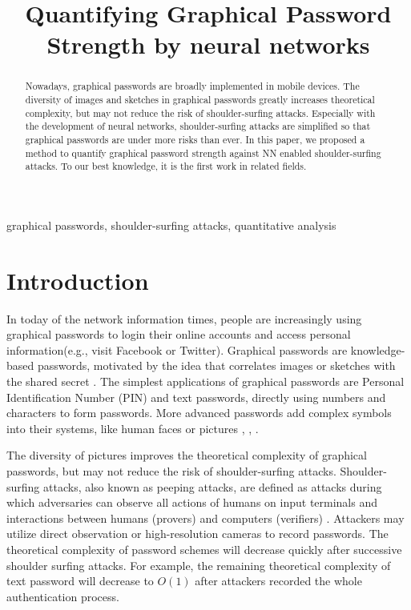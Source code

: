 \documentclass{article}
\title{Quantifying Graphical Password Strength by neural networks}
\begin{document}
  \maketitle
  \begin{abstract}
  Nowadays, graphical passwords are broadly implemented in mobile devices. The diversity of images and sketches 
  in graphical passwords greatly increases theoretical complexity, but may not reduce the risk of 
  shoulder-surfing attacks. Especially with the development of neural networks, shoulder-surfing attacks are 
  simplified so that graphical passwords are under more risks than ever. In this paper, we proposed a method 
  to quantify graphical password strength against NN enabled shoulder-surfing attacks. To our best knowledge, 
  it is the first work in related fields.
  \end{abstract}
  \begin{keywords}
  graphical passwords, shoulder-surfing attacks, quantitative analysis
  \end{keywords}
  \section{Introduction}
  \label{sec:intro}
  
  In today of the network information times, people are increasingly using graphical passwords
  to login their online accounts and access personal information(e.g., visit Facebook or Twitter). 
  Graphical passwords are knowledge-based passwords, motivated by the idea that correlates images 
  or sketches with the shared secret \cite{DBLP:journals/csur/BiddleCO12}. 
  The simplest applications of graphical passwords are Personal Identification Number (PIN) 
  and text passwords, directly using numbers and characters to form passwords. More advanced passwords 
  add complex symbols into their systems, like human faces or pictures \cite{Passfaces}, 
  \cite{DBLP:conf/uss/JermynMMRR99}, \cite{DBLP:conf/soups/WiedenbeckWBBM05}.
  
  The diversity of pictures improves the theoretical complexity of graphical passwords, but 
  may not reduce the risk of shoulder-surfing attacks. Shoulder-surfing attacks, also known as peeping attacks, 
  are defined as attacks during which adversaries can observe all actions of humans on input terminals and 
  interactions between humans (provers) and computers (verifiers) \cite{DBLP:journals/iacr/LiS05}. Attackers may utilize direct observation or 
  high-resolution cameras to record passwords. The theoretical complexity of password schemes will decrease 
  quickly after successive shoulder surfing attacks. For example, the remaining theoretical complexity of text 
  password will decrease to $O(1)$ after attackers recorded the whole authentication process.
  
\end{document}
